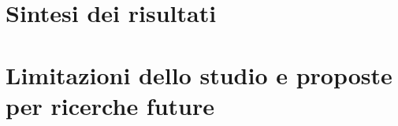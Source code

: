 \section{Sintesi dei risultati}
\section{Limitazioni dello studio e proposte per ricerche future}



%

%
